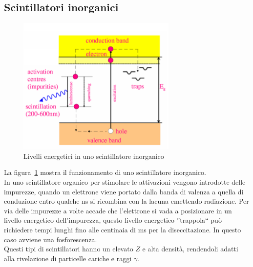 \subsection{Scintillatori inorganici}
\begin{figure}[htb]
\begin{center}
\includegraphics{./Immagini/LivelliEnergeticiScintillatore.png}
\caption{Livelli energetici in uno scintillatore inorganico}
\label{fig:livInorganico}
\end{center}
\end{figure}
La figura~\ref{fig:livInorganico} mostra il funzionamento di uno scintillatore inorganico.\\
In uno scintillatore organico per stimolare le attivazioni vengono introdotte delle impurezze, quando un elettrone viene portato
dalla banda di valenza a quella di conduzione entro qualche ns si ricombina con la lacuna emettendo radiazione.
Per via delle impurezze a volte accade che l'elettrone si vada a posizionare in un livello energetico dell'impurezza, questo
livello energetico ''trappola`` pu\`o richiedere tempi lunghi fino alle centinaia di ms per la diseccitazione. 
In questo caso avviene una fosforescenza.\\
Questi tipi di scintillatori hanno un elevato $Z$ e alta densit\`a, rendendoli adatti alla rivelazione di particelle cariche e raggi $\gamma$.
